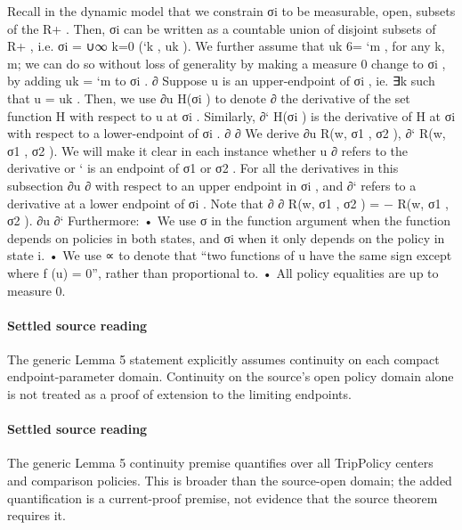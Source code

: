 \documentclass[10pt]{article}
\begin{document}
\begin{ReviewVerbatim}
Recall in the dynamic model that we constrain σi to be measurable, open, subsets of the R+ . Then,
σi can be written as a countable union of disjoint subsets of R+ , i.e. σi = ∪∞
k=0 (`k , uk ). We further
assume that uk 6= `m , for any k, m; we can do so without loss of generality by making a measure 0
change to σi , by adding uk = `m to σi .
∂
Suppose u is an upper-endpoint of σi , ie. ∃k such that u = uk . Then, we use ∂u
H(σi ) to denote
∂
the derivative of the set function H with respect to u at σi . Similarly, ∂` H(σi ) is the derivative of
H at σi with respect to a lower-endpoint of σi .
∂
∂
We derive ∂u
R(w, {σ1 , σ2 }), ∂`
R(w, {σ1 , σ2 }). We will make it clear in each instance whether u
∂
refers to the derivative
or ` is an endpoint of σ1 or σ2 . For all the derivatives in this subsection ∂u
∂
with respect to an upper endpoint in σi , and ∂` refers to a derivative at a lower endpoint of σi .
Note that
∂
∂
R(w, {σ1 , σ2 }) = − R(w, {σ1 , σ2 }).
∂u
∂`
Furthermore:
• We use σ in the function argument when the function depends on policies in both states, and
σi when it only depends on the policy in state i.
• We use ∝ to denote that “two functions of u have the same sign except where f (u) = 0”,
rather than proportional to.
• All policy equalities are up to measure 0.
\end{ReviewVerbatim}

\paragraph{Settled source reading}
\begin{sloppypar}
The generic Lemma 5 statement explicitly assumes continuity on each compact endpoint-\allowbreak{}parameter domain.\allowbreak{} Continuity on the source’s open policy domain alone is not treated as a proof of extension to the limiting endpoints.\allowbreak{}
\end{sloppypar}
\paragraph{Settled source reading}
\begin{sloppypar}
The generic Lemma 5 continuity premise quantifies over all TripPolicy centers and comparison policies.\allowbreak{} This is broader than the source-\allowbreak{}open domain;\allowbreak{} the added quantification is a current-\allowbreak{}proof premise, not evidence that the source theorem requires it.\allowbreak{}
\end{sloppypar}
\end{document}
